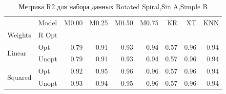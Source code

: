 \begin{table}
\caption{Метрика R2 для набора данных Rotated Spiral,Sin A,Simple B}
\label{tab:R2_Rotated Spiral,Sin A,Simple B}
\begin{tabular}{llrrrrrrr}
\toprule
 & Model & M0.00 & M0.25 & M0.50 & M0.75 & KR & XT & KNN \\
Weights & R Opt &  &  &  &  &  &  &  \\
\midrule
\multirow[t]{2}{*}{Linear} & Opt & 0.79 & 0.91 & 0.93 & 0.94 & 0.57 & 0.96 & 0.94 \\
 & Unopt & 0.79 & 0.91 & 0.93 & 0.94 & 0.57 & 0.96 & 0.94 \\

\multirow[t]{2}{*}{Squared} & Opt & 0.92 & 0.95 & 0.96 & 0.96 & 0.57 & 0.96 & 0.94 \\
 & Unopt & 0.93 & 0.94 & 0.95 & 0.96 & 0.57 & 0.96 & 0.94 \\

\bottomrule
\end{tabular}
\end{table}
